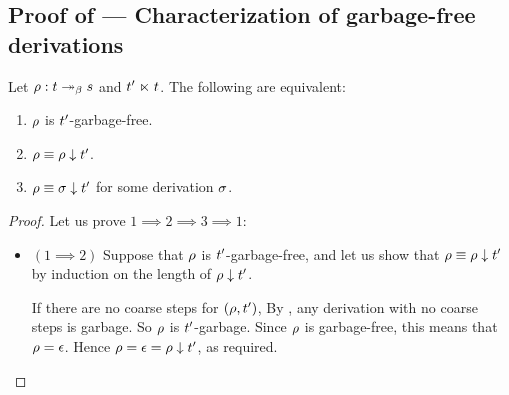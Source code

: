 \subsection*{Proof of  --- Characterization of garbage-free derivations}
\label{characterization_of_garbage_free_derivations_proof}
Let $\rho : t \mathrel{\twoheadrightarrow_\beta} s$ and $t' \mathrel{\ltimes} t$.
The following are equivalent:
\begin{enumerate}
\item $\rho$ is $t'$-garbage-free.
\item $\rho \equiv \rho \downarrow t'$.
\item $\rho \equiv \sigma \downarrow t'$ for some derivation $\sigma$.
\end{enumerate}
\begin{proof}
Let us prove $1 \implies 2 \implies 3 \implies 1$:
\begin{itemize}
\item $(1 \implies 2)$
  Suppose that $\rho$ is $t'$-garbage-free,
  and let us show that $\rho \equiv \rho \downarrow t'$
  by induction on the length of $\rho \downarrow t'$.

  If there are no coarse steps for $(\rho,t')$,
  By , any derivation with no coarse steps is garbage.
  So $\rho$ is $t'$-garbage.
  Since $\rho$ is garbage-free, this means that $\rho = \epsilon$.
  Hence $\rho = \epsilon = \rho \downarrow t'$, as required.


\end{itemize}
\end{proof}

